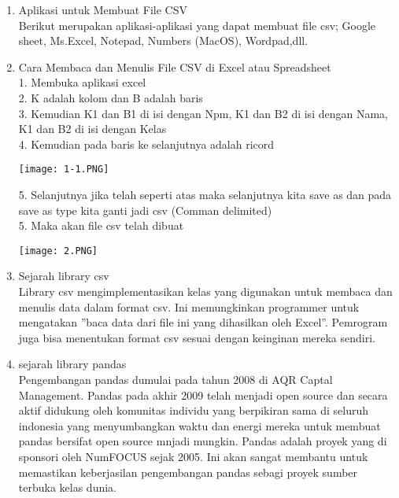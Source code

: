 \documentclass{article}
\begin{document}
\begin{enumerate}
    \item Aplikasi untuk Membuat File CSV\\
    Berikut merupakan aplikasi-aplikasi yang dapat membuat ﬁle csv; Google sheet, Ms.Excel, Notepad, Numbers (MacOS), Wordpad,dll.
    
    \item Cara Membaca dan Menulis File CSV di Excel atau Spreadsheet\\
     1. Membuka aplikasi excel\\
     2. K adalah kolom dan B adalah baris\\
     3. Kemudian K1 dan B1 di isi dengan Npm, K1 dan B2 di isi dengan Nama, K1 dan B2 di isi dengan Kelas \\
     4. Kemudian pada baris ke selanjutnya adalah ricord\\
     \begin{center}
    \texttt{[image: 1-1.PNG]}
    \end{center}
     5. Selanjutnya jika telah seperti atas maka selanjutnya kita save as dan pada save as type kita ganti jadi csv (Comman delimited)\\
     5. Maka akan ﬁle csv telah dibuat\\
     \begin{center}
    \texttt{[image: 2.PNG]}
    \end{center}
     
     \item  Sejarah library csv \\
     Library csv mengimplementasikan kelas yang digunakan untuk membaca dan menulis data dalam format csv. Ini memungkinkan programmer untuk mengatakan ”baca data dari ﬁle ini yang dihasilkan oleh Excel”. Pemrogram juga bisa menentukan format csv sesuai dengan keinginan mereka sendiri.
     
     \item  sejarah library pandas\\
     Pengembangan pandas dumulai pada tahun 2008 di AQR Captal Management. Pandas pada akhir 2009 telah menjadi open source dan secara aktif didukung oleh komunitas individu yang berpikiran sama di seluruh indonesia yang menyumbangkan waktu dan energi mereka untuk membuat pandas bersifat open source mnjadi mungkin. Pandas adalah proyek yang di sponsori oleh NumFOCUS sejak 2005. Ini akan sangat membantu untuk memastikan keberjasilan pengembangan pandas sebagi proyek sumber terbuka kelas dunia.
     

\end{enumerate}
\end{document}
